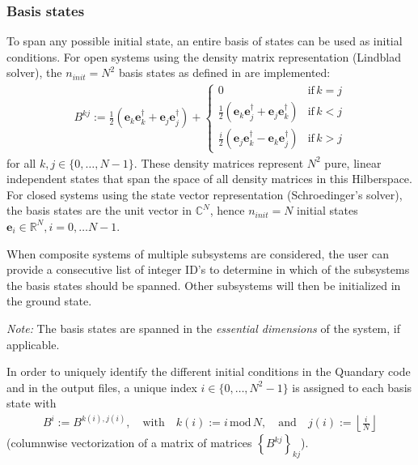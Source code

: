 \documentclass[11pt]{article}
\newcommand{\R}{\mathds{R}}
\newcommand{\C}{\mathds{C}}
\newcommand{\bs}[1]{{\boldsymbol{#1}}}
\begin{document}
\subsubsection{Basis states}


To span any possible initial state, an entire basis of states can be used as initial conditions. For open systems using the density matrix representation (Lindblad solver), the $n_{init}=N^2$ basis states as defined in \cite{guenther2021quantum} are implemented:
\begin{align}\label{eq:basismats}
B^{kj} := \frac 12 \left(\bs{e}_k\bs{e}_k^\dagger + \bs{e}_j\bs{e}_j^\dagger\right) +  \begin{cases} 
          0 & \text{if} \, k=j \\ 
        \frac 12 \left( \bs{e}_k\bs{e}_j^\dagger  + \bs{e}_j\bs{e}_k^\dagger \right) & \text{if} \, k<j \\
        \frac i2 \left( \bs{e}_j\bs{e}_k^\dagger  - \bs{e}_k\bs{e}_j^\dagger \right) & \text{if} \, k>j
      \end{cases} 
\end{align}
for all $k,j\in\{0,\dots, N-1\}$.
These density matrices represent $N^2$ pure, linear independent states that span the space of all density matrices in this Hilberspace. For closed systems using the state vector representation (Schroedinger's solver), the basis states are the unit vector in $\C^{N}$, hence $n_{init} = N$ initial states $\boldsymbol{e}_i \in \R^N, i=0,\dots N-1$. 

When composite systems of multiple subsystems are considered, the user can provide a consecutive list of integer ID's to determine in which of the subsystems the basis states should be spanned. Other subsystems will then be initialized in the ground state.

\textit{Note:} The basis states are spanned in the \textit{essential dimensions} of the system, if applicable. 

In order to uniquely identify the different initial conditions in the Quandary code and in the output files, a
unique index $i \in \{0,\dots, N^2-1\}$ is assigned to each basis state with 
\begin{align*}
  B^i := B^{k(i), j(i)}, \quad \text{with} \quad k(i) := i \,\mbox{mod}\, N,
  \quad \text{and} \quad j(i) := \left\lfloor \frac{i}{N} \right\rfloor
\end{align*}
(columnwise vectorization of a matrix of matrices $\left\{B^{kj}\right\}_{kj}$). 
\end{document}
